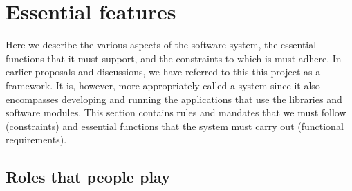 \documentclass[draftmode,draftwater]{memarticle}
\begin{document}
\chapter{Essential features}

Here we describe the various aspects of the software system, the
essential functions that it must support, and the constraints to which
is must adhere. In earlier proposals and discussions, we have referred
to this this project as a framework. It is, however, more appropriately
called a system since it also encompasses developing and running the
applications that use the libraries and software modules. This section
contains rules and mandates that we must follow (constraints) and
essential functions that the system must carry out (functional
requirements).

\section{Roles that people play}
\end{document}
